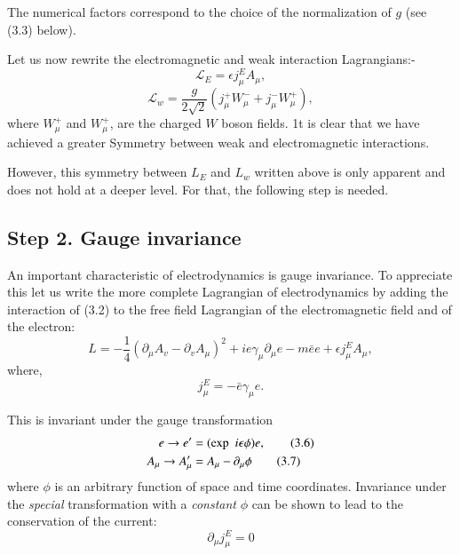 The numerical factors correspond to the choice of the normalization of $g$ (see (3.3) below).

Let us now rewrite the electromagnetic and weak interaction Lagrangians:- 
\begin{equation*}
\mathcal{L}_{E}= \epsilon j_{\mu}^{E} A_{\mu},\tag{3.2}
\end{equation*} 
\begin{equation*}
\mathcal{L}_{w}= \frac{g}{2\sqrt{2}}(j^{+}_{\mu}W^{-}_{\mu} + j^{-}_{\mu} W^{+}_{\mu}),\tag{3.3}
\end{equation*}
where $W^{+}_{\mu}$ and $W^{+}_{\mu}$, are the charged $W$ boson fields. 1t is clear that we have achieved a greater
Symmetry between weak and electromagnetic interactions. 

However, this symmetry between $L_{E}$ and $L_{w}$ written above is only apparent and does not hold
at a deeper level. For that, the following step is needed. 

\subsection*{Step 2. Gauge invariance}

An important characteristic of electrodynamics is gauge invariance. To appreciate this let us write
the more complete Lagrangian of electrodynamics by adding the interaction of (3.2) to the free
field Lagrangian of the electromagnetic field and of the electron: 
\begin{equation*}
L= - \frac{1}{4}(\partial_{\mu} A_{v}-\partial_{v}A_{\mu})^{2} + ie\gamma_{\mu}\partial_{\mu}e-m\bar{e}e + \epsilon j^{E}_{\mu}A_{\mu},\tag{3.4}
\end{equation*}
where,
\begin{equation*}
j^{E}_{\mu} = - \bar{e}\gamma_{\mu}e.\tag{3.5}
\end{equation*}

This is invariant under the gauge transformation 
\begin{align*}
e \rightarrow e' &= ({\rm exp}~~ i \epsilon \phi)e,\tag{3.6}\\
A_{\mu} \rightarrow A_{\mu}' &= A_{\mu}-\partial_{\mu}\phi\tag{3.7}
\end{align*}
where $\phi$ is an arbitrary function of space and time coordinates. Invariance under the {\it special}
transformation with a {\it constant} $\phi$ can be shown to lead to the conservation of the current: 
\begin{equation*}
\partial_{\mu} j^{E}_{\mu} = 0\tag{3.8}
\end{equation*}

